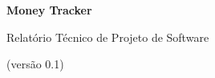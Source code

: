 \begin{titlepage}
    \begin{flushright}
        {\Huge{\textbf{Money Tracker}}}

        \vspace*{3mm}
        
        {\large{Relatório Técnico de Projeto de Software}}

        \vspace*{3mm}
        
        (versão 0.1)
    \end{flushright}

    
\end{titlepage}